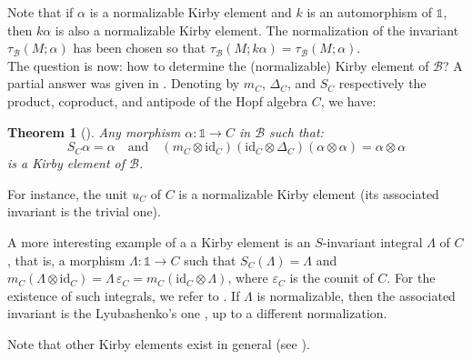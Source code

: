 \documentclass[a4paper]{amsart}
\newtheorem{thm}{Theorem}[section]
\theoremstyle{definition}
\newcommand{\co}{\colon}
\newcommand{\id}{\mathrm{id}}
\newcommand{\bb}{\mathcal{B}}
\newcommand{\un}{\mathbb{1}}
\begin{document}
Note that if $\alpha$ is a normalizable Kirby element and $k$ is an automorphism of $\un$,
then $k\alpha$ is also a normalizable Kirby element. The normalization of the invariant $\tau_\bb(M;\alpha)$ has been chosen
so that $\tau_\bb(M;k\alpha)=\tau_\bb(M;\alpha)$.\\

The question is now: how to determine the (normalizable) Kirby element of $\bb$? A partial answer was given in \cite{Vir}.
Denoting by $m_C$, $\Delta_C$, and $S_C$ respectively the product, coproduct, and antipode of the Hopf algebra $C$, we have:
\begin{thm}[{\cite[Theorem~2.5]{Vir}}]\label{thmkirbel}
Any morphism $\alpha\co  \un \to C$ in $\bb$ such that:
\begin{equation*}
S_C \alpha=\alpha \quad \text{and} \quad (m_C \otimes \id_C)(\id_C \otimes \Delta_C)(\alpha \otimes \alpha)=\alpha \otimes
\alpha
\end{equation*}
is a Kirby element of $\bb$.
\end{thm}
For instance, the unit $u_C$ of $C$ is a normalizable Kirby element (its associated invariant is the trivial one).

A more interesting example of a a Kirby element is an $S$-invariant integral $\Lambda$ of $C$, that is, a morphism $\Lambda
\co \un \to C$ such that $S_C(\Lambda)=\Lambda$ and $m_C(\Lambda \otimes \id_C)=\Lambda\, \varepsilon_C=m_C(\id_C \otimes
\Lambda)$, where $\varepsilon_C$ is the counit of $C$. For the existence of such integrals,  we refer to \cite{BKLT}. If
$\Lambda$ is normalizable, then the associated invariant is the Lyubashenko's one \cite{Lyu2}, up to a different
normalization.

Note that other Kirby elements exist in general (see \cite{Vir}).
\end{document}
